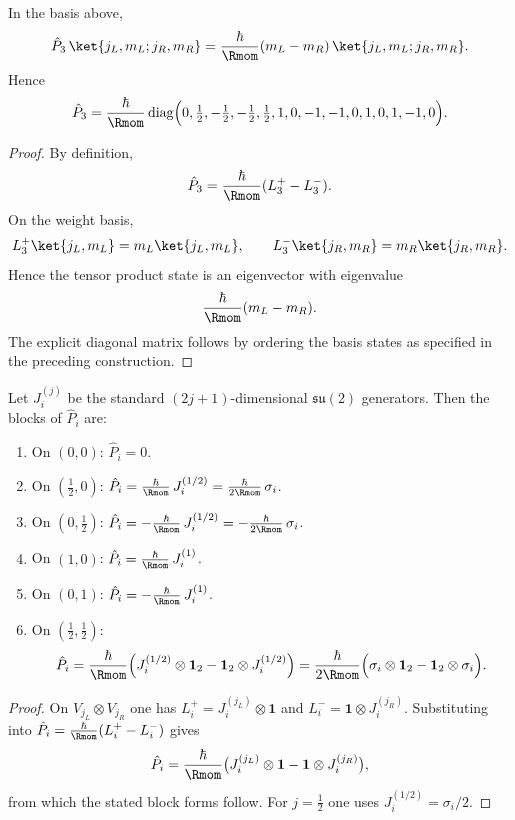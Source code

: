 \documentclass[11pt,a4paper]{article}
\begin{document}
\begin{proposition}
\label{p2:prop:P3_diag}
In the basis above,
\[
\hat{P}_3\,\ket{j_L,m_L;j_R,m_R}=\frac{\hbar}{\Rmom}(m_L-m_R)\,\ket{j_L,m_L;j_R,m_R}.
\]
Hence
\[
\hat{P}_3=\frac{\hbar}{\Rmom}\,\mathrm{diag}\Big(0,\tfrac12,-\tfrac12,-\tfrac12,\tfrac12,1,0,-1,-1,0,1,0,1,-1,0\Big).
\]
\end{proposition}

\begin{proof}
\leavevmode\par\noindent
By definition,
\[
  \hat{P}_3=\frac{\hbar}{\Rmom}(L_3^{+}-L_3^{-}).
\]
On the weight basis,
\[
  L_3^{+}\ket{j_L,m_L}=m_L\ket{j_L,m_L},
  \qquad
  L_3^{-}\ket{j_R,m_R}=m_R\ket{j_R,m_R}.
\]
Hence the tensor product state is an eigenvector with eigenvalue
\[
  \frac{\hbar}{\Rmom}(m_L-m_R).
\]
The explicit diagonal matrix follows by ordering the basis states as specified
in the preceding construction.
\end{proof}

\begin{proposition}
\label{p2:prop:P12_blocks}
Let $J_i^{(j)}$ be the standard $(2j+1)$-dimensional $\mathfrak{su}(2)$ generators. Then the blocks of
$\hat{P}_i$ are:
\begin{enumerate}[label=(\roman*), leftmargin=2.1em]
\item On $(0,0)$: $\hat{P}_i=0$.
\item On $(\tfrac12,0)$: $\hat{P}_i=\frac{\hbar}{\Rmom}\,J_i^{(1/2)}=\frac{\hbar}{2\Rmom}\,\sigma_i$.
\item On $(0,\tfrac12)$: $\hat{P}_i=-\frac{\hbar}{\Rmom}\,J_i^{(1/2)}=-\frac{\hbar}{2\Rmom}\,\sigma_i$.
\item On $(1,0)$: $\hat{P}_i=\frac{\hbar}{\Rmom}\,J_i^{(1)}$.
\item On $(0,1)$: $\hat{P}_i=-\frac{\hbar}{\Rmom}\,J_i^{(1)}$.
\item On $(\tfrac12,\tfrac12)$:
\[
\hat{P}_i=\frac{\hbar}{\Rmom}\Big(J_i^{(1/2)}\otimes \mathbf{1}_2-\mathbf{1}_2\otimes J_i^{(1/2)}\Big)
=\frac{\hbar}{2\Rmom}\Big(\sigma_i\otimes \mathbf{1}_2-\mathbf{1}_2\otimes \sigma_i\Big).
\]
\end{enumerate}
\end{proposition}

\begin{proof}
On \(V_{j_L}\otimes V_{j_R}\) one has \(L_i^{+}=J_i^{(j_L)}\otimes \mathbf{1}\) and \(L_i^{-}=\mathbf{1}\otimes J_i^{(j_R)}\).
Substituting into \(\hat{P}_i=\frac{\hbar}{\Rmom}(L_i^{+}-L_i^{-})\) gives
\[
\hat{P}_i=\frac{\hbar}{\Rmom}\bigl(J_i^{(j_L)}\otimes \mathbf{1}-\mathbf{1}\otimes J_i^{(j_R)}\bigr),
\]
from which the stated block forms follow. For $j=\tfrac12$ one uses $J_i^{(1/2)}=\sigma_i/2$.
\end{proof}
\end{document}
